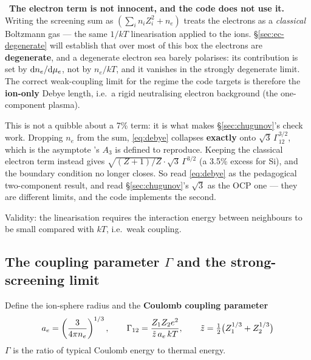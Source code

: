 \begin{warn}
\warnglyph{}~\textbf{The electron term is not innocent, and the code does not
use it.} Writing the screening sum as $(\sum_i n_iZ_i^2 + n_e)$ treats the
electrons as a \emph{classical} Boltzmann gas --- the same $1/kT$ linearisation
applied to the ions. \S\ref{sec:ec-degenerate} will establish that over most of
this box the electrons are \textbf{degenerate}, and a degenerate electron sea
barely polarises: its contribution is set by $\mathrm{d} n_e/\mathrm{d}\mu_{e}$, not by $n_e/kT$,
and it vanishes in the strongly degenerate limit. The correct weak-coupling
limit for the regime the code targets is therefore the \textbf{ion-only} Debye
length, i.e.\ a rigid neutralising electron background (the one-component
plasma).
\end{warn}

This is not a quibble about a 7\% term: it is what makes
\S\ref{sec:chugunov}'s check work. Dropping $n_e$ from the sum, \eqref{eq:debye}
collapses \textbf{exactly} onto $\sqrt3\,\Gamma_{12}^{3/2}$, which is the
asymptote 's $A_3$ is defined to reproduce. Keeping the
classical electron term instead gives $\sqrt{(Z+1)/Z}\cdot\sqrt3\,\Gamma^{3/2}$
(a 3.5\% excess for Si), and the boundary condition no longer closes.
\derivedhere{} So read \eqref{eq:debye} as the pedagogical two-component result,
and read \S\ref{sec:chugunov}'s $\sqrt3$ as the OCP one --- they are different
limits, and the code implements the second.

Validity: the linearisation requires the interaction energy between neighbours
to be small compared with $kT$, i.e.\ weak coupling.

\subsection{The coupling parameter \texorpdfstring{$\Gamma$}{Gamma} and the strong-screening limit}
\label{sec:gamma}

Define the ion-sphere radius and the \textbf{Coulomb coupling parameter}
%
\begin{equation}
a_e = \left(\frac{3}{4\pi n_e}\right)^{1/3},
\qquad
\Gamma_{12} = \frac{Z_1Z_2e^2}{\tilde z\,a_e\,kT},
\qquad
\tilde z = \tfrac{1}{2}\bigl(Z_1^{1/3}+Z_2^{1/3}\bigr)
\label{eq:gammadef}
\end{equation}
%
$\Gamma$ is the ratio of typical Coulomb energy to thermal energy.

